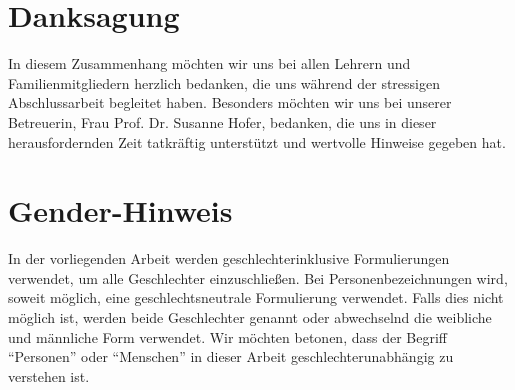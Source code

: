 \signature{\titlePageFullNameMj}

\signature{\titlePageFullNameZb}

\newpage

\section{Danksagung}
In diesem Zusammenhang möchten wir uns bei allen Lehrern und Familienmitgliedern herzlich bedanken, die uns während der stressigen Abschlussarbeit begleitet haben. Besonders möchten wir uns bei unserer Betreuerin, Frau Prof. Dr. Susanne Hofer, bedanken, die uns in dieser herausfordernden Zeit tatkräftig unterstützt und wertvolle Hinweise gegeben hat.

\newpage

\section{Gender-Hinweis}
In der vorliegenden Arbeit werden geschlechterinklusive Formulierungen verwendet, um alle Geschlechter einzuschließen. Bei Personenbezeichnungen wird, soweit möglich, eine geschlechtsneutrale Formulierung verwendet. Falls dies nicht möglich ist, werden beide Geschlechter genannt oder abwechselnd die weibliche und männliche Form verwendet. Wir möchten betonen, dass der Begriff ``Personen'' oder ``Menschen'' in dieser Arbeit geschlechterunabhängig zu verstehen ist.

\newpage

